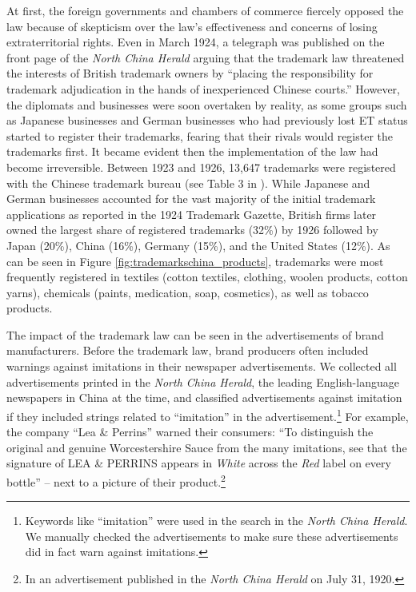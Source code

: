 \documentclass[12pt]{article}
\begin{document}
At first, the foreign governments and chambers of commerce fiercely opposed the law because of skepticism over the law's effectiveness and concerns of losing extraterritorial rights. Even in March 1924, a telegraph was published on the front page of the \emph{North China Herald} arguing that the trademark law threatened the interests of British trademark owners by ``placing the responsibility for trademark adjudication in the hands of inexperienced Chinese courts.'' However, the diplomats and businesses were soon overtaken by reality, as some groups such as Japanese businesses and German businesses who had previously lost ET status started to register their trademarks, fearing that their rivals would register the trademarks first. It became evident then the implementation of the law had become irreversible. Between 1923 and 1926, 13,647 trademarks were registered with the Chinese trademark bureau (see Table 3 in \citealp{Motono2011}). While Japanese and German businesses accounted for the vast majority of the initial trademark applications as reported in the 1924 Trademark Gazette, British firms later owned the largest share of registered trademarks (32\%) by 1926 followed by Japan (20\%), China (16\%), Germany (15\%), and the United States (12\%). As can be seen in Figure \ref{fig:trademarkschina_products}, trademarks were most frequently registered in  textiles (cotton textiles, clothing, woolen products, cotton yarns), chemicals (paints, medication, soap, cosmetics), as well as tobacco products.


The impact of the trademark law can be seen in the advertisements of brand manufacturers. Before the trademark law, brand producers often included warnings against imitations in their newspaper advertisements. We collected all advertisements printed in the \emph{North China Herald}, the leading English-language newspapers in China at the time, and classified  advertisements against imitation if they included strings related to ``imitation'' in the advertisement.\footnote{Keywords like ``imitation'' were used in the search in the \emph{North China Herald}. We manually checked the advertisements to make sure these advertisements did in fact warn against imitations.} For example, the company ``Lea \& Perrins'' warned their consumers: ``To distinguish the original and genuine Worcestershire Sauce from the many imitations, see that the signature of LEA \& PERRINS appears in \emph{White} across the \emph{Red} label on every bottle'' -- next to a picture of their product.\footnote{In an advertisement published in the \emph{North China Herald}  on July 31, 1920.} 
\end{document}
